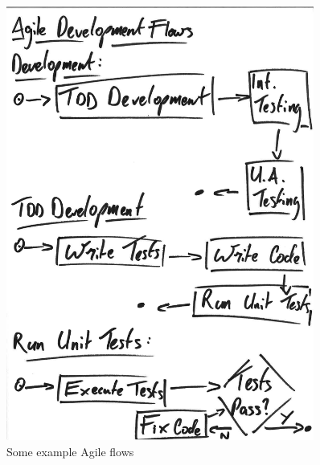 \begin{figure}[p]
    \centering
    \includegraphics[width=0.9\textwidth]{images/drawn_subflows.pdf}
    \caption{Some example Agile flows}
    \label{fig:example_flows}
\end{figure}

